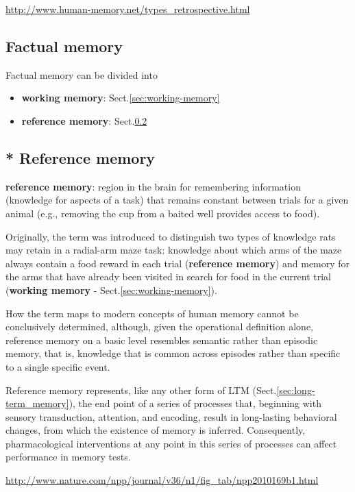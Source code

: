 \url{http://www.human-memory.net/types_retrospective.html}

\subsection{Factual memory}
\label{sec:factual-memory}

Factual memory can be divided into
\begin{itemize}
  \item {\bf working memory}: Sect.\ref{sec:working-memory} 
  \item {\bf reference memory}:  Sect.\ref{sec:reference-memory}
\end{itemize}


\subsection{* Reference memory}
\label{sec:reference-memory}

{\bf reference memory}:  region in the brain for remembering information
(knowledge for aspects of a task) that remains constant between trials
for a given animal (e.g., removing the cup from a baited well provides access to
food).

Originally, the term was introduced to distinguish two types of knowledge rats
may retain in a radial-arm maze task: knowledge about which arms of the maze
always contain a food reward in each trial ({\bf reference memory}) and memory
for the arms that have already been visited in search for food in the current trial
({\bf working memory} - Sect.\ref{sec:working-memory}).

How the term maps to modern concepts of human memory cannot be conclusively
determined, although, given the operational definition alone, reference memory
on a basic level resembles semantic rather than episodic memory, that is,
knowledge that is common across episodes rather than specific to a single
specific event.

Reference memory represents, like any other form of LTM
(Sect.\ref{sec:long-term_memory}), the end point of a series of processes that,
beginning with sensory transduction, attention, and encoding, result in
long-lasting behavioral changes, from which the existence of memory is inferred.
Consequently, pharmacological interventions at any point in this series of
processes can affect performance in memory tests.

\url{http://www.nature.com/npp/journal/v36/n1/fig_tab/npp2010169b1.html}

